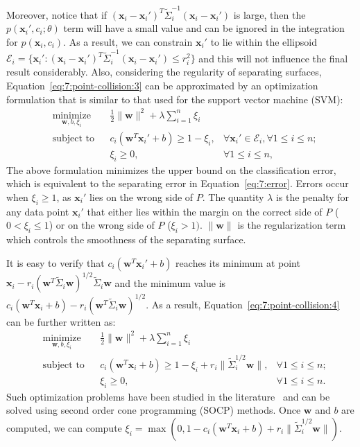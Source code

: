 Moreover, notice that if $(\mathbf x_i - \mathbf x_i')^T \widetilde{\Sigma}_i^{-1} (\mathbf x_i - \mathbf x_i')$ is large, then the $p(\mathbf x_i', c_i; \theta)$ term
will have a small value and can be ignored in the integration for $p(\mathbf x_i, c_i)$. As a result, we can constrain $\mathbf x_i'$ to lie within the
ellipsoid $\mathcal{E}_i = \{\mathbf x_i': (\mathbf x_i - \mathbf x_i')^T \widetilde{\Sigma}_i^{-1} (\mathbf x_i - \mathbf x_i') \leq r_i^2\}$ and this will not influence
the final result considerably. Also, considering the regularity of separating surfaces, Equation~\ref{eq:7:point-collision:3} can be approximated by an optimization
formulation that is similar to that used for the support vector machine (SVM):
\begin{equation}
\label{eq:7:point-collision:4}
\begin{aligned}
	& \underset{\mathbf w, b, \xi_i}{\text{minimize}}
	& & \frac{1}{2}\|\mathbf w\|^2 + \lambda \sum_{i=1}^n \xi_i \\
	& \text{subject to}
	& & c_i(\mathbf w^T \mathbf x_i' + b) \geq 1 - \xi_i, & \forall \mathbf x_i' \in \mathcal{E}_i, \forall 1 \leq i \leq n; \\
    & & & \xi_i \geq 0, & \forall 1 \leq i \leq n,
	\end{aligned}
	\end{equation}
The above formulation minimizes the upper bound on the classification error, which is equivalent to the separating error in Equation~\ref{eq:7:error}. Errors occur when $\xi_i \geq 1$, as $\mathbf x_i'$ lies on the wrong side of $P$. The quantity $\lambda$ is the penalty for any data point $\mathbf x_i'$ that either lies within the margin on the correct side of $P$ ($0 < \xi_i \leq 1$) or on the wrong side of $P$ ($\xi_i > 1)$. $\|\mathbf w\|$ is the regularization term which controls the smoothness of the separating surface.

It is easy to verify that $c_i(\mathbf w^T \mathbf x_i' + b)$ reaches its minimum at point $\mathbf x_i - r_i (\mathbf w^T \widetilde{\Sigma}_i \mathbf w)^{1/2}\widetilde{\Sigma}_i \mathbf w$ and the minimum value is $c_i(\mathbf w^T \mathbf x_i + b) - r_i (\mathbf w^T \widetilde{\Sigma}_i \mathbf w)^{1/2}$.   As a result,
Equation~\ref{eq:7:point-collision:4} can be further written as:
\begin{equation}
\label{eq:7:point-collision:5}
\begin{aligned}
	& \underset{\mathbf w, b, \xi_i}{\text{minimize}}
	& & \frac{1}{2}\|\mathbf w\|^2 + \lambda \sum_{i=1}^n \xi_i \\
	& \text{subject to}
	& & c_i(\mathbf w^T \mathbf x_i + b) \geq 1 - \xi_i + r_i \|\widetilde{\Sigma}_i^{1/2} \mathbf w \|, & \forall 1 \leq i \leq n; \\
    & & & \xi_i \geq 0, & \forall 1 \leq i \leq n.
	\end{aligned}
	\end{equation}
Such optimization problems have been studied in the literature~\cite{Shivaswamy:2006:SOC} and can be solved using second order cone programming (SOCP)
methods. Once $\mathbf w$ and $b$ are computed, we can compute $\xi_i = \max(0, 1 - c_i(\mathbf w^T \mathbf x_i + b) + r_i \|\widetilde{\Sigma}_i^{1/2}\mathbf w\|)$.


